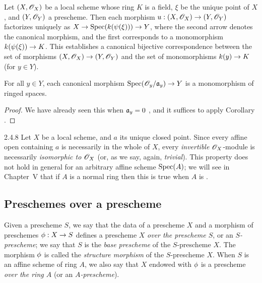 \begin{cor}[2.4.6]
\label{1.2.4.6}
Let $(X,\mathscr{O}_X)$ be a local scheme whose ring $K$ is a field, $\xi$ be the unique point of
$X$, and $(Y,\mathscr{O}_Y)$ a prescheme. Then each morphism $u:(X,\mathscr{O}_X)\to(Y,\mathscr{O}_Y)$ factorizes
uniquely as $X\to{\mathop{\mathrm{Spec}}\nolimits}(k(\psi(\xi)))\to Y$, where the second arrow denotes the canonical
morphism, and the first corresponds to a monomorphism $k(\psi(\xi))\to K$.
This establishes a canonical bijective correspondence between the set of
morphisms $(X,\mathscr{O}_X)\to (Y,\mathscr{O}_Y)$ and the set of monomorphisms $k(y)\to K$ (for
$y\in Y$).
\end{cor}

\begin{cor}[2.4.7]
\label{1.2.4.7}
For all $y\in Y$, each canonical morphism
${\mathop{\mathrm{Spec}}\nolimits}(\mathscr{O}_y/\mathfrak{a}_y)\to Y$ is a monomorphism of ringed spaces.
\end{cor}

\begin{proof}
\label{proof-1.2.4.7}
We have already seen this when $\mathfrak{a}_y=0$ , and it suffices
to apply Corollary .
\end{proof}

\begin{rmk}{2.4.8}
\label{1.2.4.8}
Let $X$ be a local scheme, and $a$ its unique
closed point. Since every affine open containing $a$ is necessarily in the
whole of $X$, every {\em invertible} $\mathscr{O}_X$-module  is
necessarily {\em isomorphic to $\mathscr{O}_X$} (or, as we say, again, {\em trivial}).
This property does not hold in general for an arbitrary affine scheme
${\mathop{\mathrm{Spec}}\nolimits}(A)$; we will see in Chapter~V that if $A$ is a normal ring then this is
true when $A$ is .
\end{rmk}

\subsection{Preschemes over a prescheme}
\label{subsection-preschemes-over-prescheme}

\begin{defn}[2.5.1]
\label{1.2.5.1}
Given a prescheme $S$, we say that the data of a
prescheme $X$ and a morphism of preschemes $\phi:X\to S$ defines a
prescheme $X$ {\em over the prescheme $S$}, or an {\em $S$-prescheme}; we say
that $S$ is the {\em base prescheme} of the $S$-prescheme $X$. The morphism
$\phi$ is called the {\em structure morphism} of the $S$-prescheme $X$.
When $S$ is an affine scheme of ring $A$, we also say that $X$ endowed with
$\phi$ is a prescheme {\em over the ring $A$} (or an {\em $A$-prescheme}).
\end{defn}

